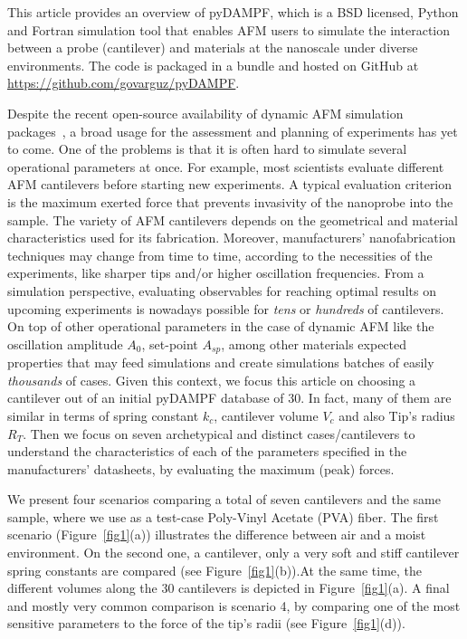 \documentclass[letterpaper,compsoc,twoside]{IEEEtran}
\begin{document}
This article provides an overview of pyDAMPF, which is a BSD licensed, Python and Fortran simulation tool that enables AFM users to simulate the interaction between a probe (cantilever) and materials at the nanoscale under diverse environments. The code is packaged in a bundle and hosted on GitHub at \url{https://github.com/govarguz/pyDAMPF}. 

Despite the recent open-source availability of dynamic AFM simulation packages~\cite{dForce,Veda}, a broad usage for the assessment and planning of experiments has yet to come. One of the problems is that it is often hard to simulate several operational parameters at once. For example, most scientists evaluate different AFM cantilevers before starting new experiments. A typical evaluation criterion is the maximum exerted force that prevents invasivity of the nanoprobe into the sample. The variety of AFM cantilevers depends on the geometrical and material characteristics used for its fabrication. Moreover, manufacturers' nanofabrication techniques may change from time to time, according to the necessities of the experiments, like sharper tips and/or higher oscillation frequencies. 
From a simulation perspective, evaluating observables for reaching optimal results on upcoming experiments is nowadays possible for \textit{tens} or \textit{hundreds} of cantilevers. On top of other operational parameters in the case of dynamic AFM like the oscillation amplitude $A_0$, set-point $A_{sp}$, among other materials expected properties that may feed simulations and create simulations batches of easily \textit{thousands} of cases. 
Given this context, we focus this article on choosing a cantilever out of an initial pyDAMPF database of 30. In fact, many of them are similar in terms of spring constant $k_c$, cantilever volume $V_c$ and also Tip's radius $R_T$. Then we focus on seven archetypical and distinct cases/cantilevers to understand the characteristics of each of the parameters specified in the manufacturers' datasheets, by evaluating the maximum (peak) forces.

We present four scenarios comparing a total of seven cantilevers and the same sample, where we use as a test-case Poly-Vinyl Acetate (PVA) fiber. The first scenario (Figure~\ref{fig1}(a)) illustrates the difference between air and a moist environment. On the second one, a cantilever, only a very soft and stiff cantilever spring constants are compared (see Figure~\ref{fig1}(b)).At the same time, the different volumes along the 30 cantilevers is depicted in Figure~\ref{fig1}(a). A final and mostly very common comparison is scenario 4, by comparing one of the most sensitive parameters to the force of the tip's radii (see Figure~\ref{fig1}(d)).
\end{document}
